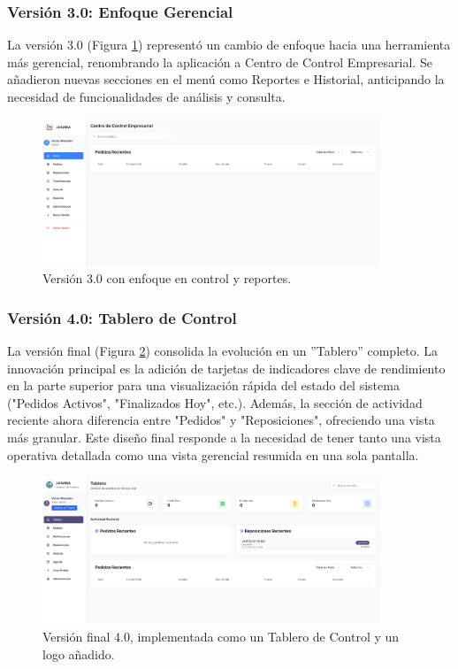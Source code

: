 \documentclass[12pt,letterpaper,spanish]{report}
\begin{document}
\subsubsection{Versión 3.0: Enfoque Gerencial}
La versión 3.0 (Figura \ref{fig:v3}) representó un cambio de enfoque hacia una herramienta más gerencial, renombrando la aplicación a Centro de Control Empresarial. Se añadieron nuevas secciones en el menú como Reportes e Historial, anticipando la necesidad de funcionalidades de análisis y consulta.

\begin{figure}[H]
    \centering
    \includegraphics[width=0.9\textwidth]{V3.0.png}
    \caption{Versión 3.0 con enfoque en control y reportes.}
    \label{fig:v3}
\end{figure}

\subsubsection{Versión 4.0: Tablero de Control}
La versión final (Figura \ref{fig:v4}) consolida la evolución en un ''Tablero'' completo. La innovación principal es la adición de tarjetas de indicadores clave de rendimiento en la parte superior para una visualización rápida del estado del sistema ("Pedidos Activos", "Finalizados Hoy", etc.). Además, la sección de actividad reciente ahora diferencia entre "Pedidos" y "Reposiciones", ofreciendo una vista más granular. Este diseño final responde a la necesidad de tener tanto una vista operativa detallada como una vista gerencial resumida en una sola pantalla.

\begin{figure}[H]
    \centering
    \includegraphics[width=0.9\textwidth]{V4.0.png}
    \caption{Versión final 4.0, implementada como un Tablero de Control y un logo añadido.}
    \label{fig:v4}
\end{figure}
\end{document}
